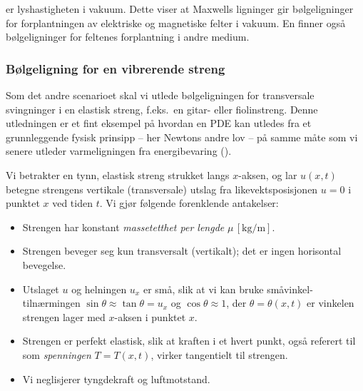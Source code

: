 \noindent er lyshastigheten i vakuum. Dette viser at Maxwells ligninger gir bølgeligninger for forplantningen av elektriske og magnetiske felter i vakuum. En finner også bølgeligninger for feltenes forplantning i andre medium.

\subsubsection{Bølgeligning for en vibrerende streng}

Som det andre scenarioet skal vi utlede bølgeligningen for transversale svingninger i en elastisk streng, f.eks.\ en gitar- eller fiolinstreng. Denne utledningen er et fint eksempel på hvordan en PDE kan utledes fra et grunnleggende fysisk prinsipp -- her Newtons andre lov -- på samme måte som vi senere utleder varmeligningen fra energibevaring ().

Vi betrakter en tynn, elastisk streng strukket langs $x$-aksen, og lar $u(x,t)$ betegne strengens vertikale (transversale) utslag fra likevektsposisjonen $u=0$ i punktet $x$ ved tiden $t$. Vi gjør følgende forenklende antakelser:
\begin{itemize}
\item Strengen har konstant \emph{massetetthet per lengde} $\mu \, [\mathrm{kg/m}]$.
\item Strengen beveger seg kun transversalt (vertikalt); det er ingen horisontal bevegelse.
\item Utslaget $u$ og helningen $u_x$ er små, slik at vi kan bruke småvinkel-tilnærmingen $\sin\theta \approx \tan\theta = u_x$ og $\cos\theta \approx 1$, der $\theta=\theta(x,t)$ er vinkelen strengen lager med $x$-aksen i punktet $x$.
\item Strengen er perfekt elastisk, slik at kraften i et hvert punkt, også referert til som \emph{spenningen} $T=T(x,t)$, virker tangentielt til strengen.
\item Vi neglisjerer tyngdekraft og luftmotstand.
\end{itemize}

